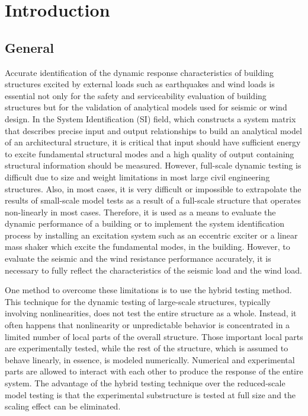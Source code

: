 \chapter{Introduction}
\label{chap:intro}
\section{General}

Accurate identification of the dynamic response characteristics of building structures excited by external loads such as earthquakes and wind loads is essential not only for the safety and serviceability evaluation of building structures but for the validation of analytical models used for seismic or wind design\citep{ljung1987system}. In the System Identification (SI) field, which constructs a system matrix that describes precise input and output relationships to build an analytical model of an architectural structure, it is critical that input should have sufficient energy to excite fundamental structural modes and a high quality of output containing structural information should be measured\citep{alvin1994second,madenci1994free}. However, full-scale dynamic testing is difficult due to size and weight limitations in most large civil engineering structures. Also, in most cases, it is very difficult or impossible to extrapolate the results of small-scale model tests as a result of a full-scale structure that operates non-linearly in most cases. Therefore, it is used as a means to evaluate the dynamic performance of a building or to implement the system identification process by installing an excitation system such as an eccentric exciter or a linear mass shaker which excite the fundamental modes, in the building. However, to evaluate the seismic and the wind resistance performance accurately, it is necessary to fully reflect the characteristics of the seismic load and the wind load.

One method to overcome these limitations is to use the hybrid testing method. This technique for the dynamic testing of large-scale structures, typically involving nonlinearities, does not test the entire structure as a whole. Instead, it often happens that nonlinearity or unpredictable behavior is concentrated in a limited number of local parts of the overall structure. Those important local parts are experimentally tested, while the rest of the structure, which is assumed to behave linearly, in essence, is modeled numerically. Numerical and experimental parts are allowed to interact with each other to produce the response of the entire system. The advantage of the hybrid testing technique over the reduced-scale model testing is that the experimental substructure is tested at full size and the scaling effect can be eliminated. 

